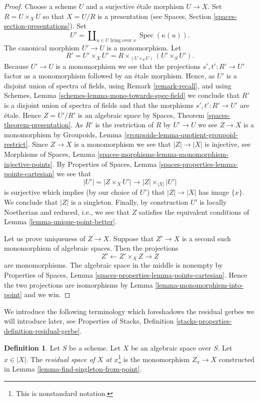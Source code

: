 \documentclass{stacks-project}
\theoremstyle{plain}
\theoremstyle{definition}
\newtheorem{definition}[subsection]{Definition}
\theoremstyle{remark}
\numberwithin{equation}{subsection}
\def\Spec{\mathop{\mathrm{Spec}}}
\begin{document}
\begin{proof}
Choose a scheme $U$ and a surjective \'etale morphism $U \to X$.
Set $R = U \times_X U$ so that $X = U/R$ is a presentation (see
Spaces, Section \ref{spaces-section-presentations}).
Set
$$
U' = \coprod\nolimits_{u \in U\text{ lying over }x} \Spec(\kappa(u)).
$$
The canonical morphism $U' \to U$ is a monomorphism. Let
$$
R' = U' \times_X U' = R \times_{(U \times_S U)} (U' \times_S U').
$$
Because $U' \to U$ is a monomorphism we see that the projections
$s', t' : R' \to U'$ factor as a monomorphism followed by an
\'etale morphism. Hence, as $U'$ is a disjoint union of spectra
of fields, using
Remark \ref{remark-recall},
and using
Schemes, Lemma \ref{schemes-lemma-mono-towards-spec-field}
we conclude that $R'$ is a disjoint union of spectra of fields and
that the morphisms $s', t' : R' \to U'$ are \'etale. Hence
$Z = U'/R'$ is an algebraic space by
Spaces, Theorem \ref{spaces-theorem-presentation}.
As $R'$ is the restriction of $R$ by $U' \to U$ we see
$Z \to X$ is a monomorphism by
Groupoids, Lemma \ref{groupoids-lemma-quotient-groupoid-restrict}.
Since $Z \to X$ is a monomorphism we see that $|Z| \to |X|$ is injective, see
Morphisms of Spaces, Lemma
\ref{spaces-morphisms-lemma-monomorphism-injective-points}.
By
Properties of Spaces, Lemma \ref{spaces-properties-lemma-points-cartesian}
we see that
$$
|U'| = |Z \times_X U'| \to |Z| \times_{|X|} |U'|
$$
is surjective which implies (by our choice of $U'$) that
$|Z| \to |X|$ has image $\{x\}$. We conclude that $|Z|$ is a singleton.
Finally, by construction $U'$ is locally Noetherian and reduced, i.e.,
we see that $Z$ satisfies the equivalent conditions of
Lemma \ref{lemma-unique-point-better}.

\medskip\noindent
Let us prove uniqueness of $Z \to X$. Suppose that
$Z' \to X$ is a second such monomorphism of algebraic spaces.
Then the projections
$$
Z' \longleftarrow Z' \times_X Z \longrightarrow Z
$$
are monomorphisms. The algebraic space in the middle is nonempty by
Properties of Spaces,
Lemma \ref{spaces-properties-lemma-points-cartesian}.
Hence the two projections are isomorphisms by
Lemma \ref{lemma-monomorphism-into-point}
and we win.
\end{proof}

\noindent
We introduce the following terminology which foreshadows
the residual gerbes we will introduce later, see
Properties of Stacks, Definition
\ref{stacks-properties-definition-residual-gerbe}.

\begin{definition}
\label{definition-residual-space}
Let $S$ be a scheme.
Let $X$ be an algebraic space over $S$. Let $x \in |X|$.
The
{\it residual space of $X$ at $x$}\footnote{This is nonstandard notation.}
is the monomorphism $Z_x \to X$ constructed in
Lemma \ref{lemma-find-singleton-from-point}.
\end{definition}
\end{document}
